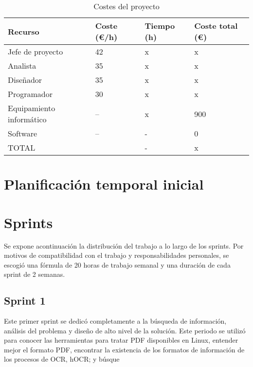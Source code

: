 \begin{table}[ht]
    \centering
    \begin{tabular}{l l l l}
        Recurso & Coste (€/h) & Tiempo (h) & Coste total (€) \\
        \hline
        \hline
        Jefe de proyecto & 42 & x & x \\
        Analista & 35 & x & x \\
        Diseñador & 35 & x & x \\
        Programador & 30 & x & x \\
        Equipamiento informático & -- & x & 900 \\
        Software & -- & - & 0 \\        
        \hline
        \hline
        TOTAL & & - & x \\        
    \end{tabular}
    \label{Tab:costes-proyecto}
    \caption{Costes del proyecto}
\end{table}

\section{Planificación temporal inicial}



\section{Sprints}

Se expone acontinuación la distribución del trabajo a lo largo de los sprints. Por motivos de compatibilidad con el trabajo y responsabilidades personales, se escogió una fórmula de 20 horas de trabajo semanal y una duración de cada sprint de 2 semanas.

\subsection{Sprint 1}

Este primer sprint se dedicó completamente a la búsqueda de información, análisis del problema y diseño de alto nivel de la solución. Este periodo se utilizó para conocer las herramientas para tratar PDF disponibles en Linux, entender mejor el formato PDF, encontrar la existencia de los formatos de información de los procesos de OCR, hOCR; y búsque

